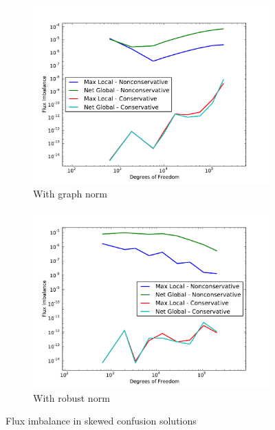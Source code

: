 \documentclass[letterpaper]{article}
\begin{document}
\begin{figure}
\centering
\begin{subfigure}[t]{0.45\textwidth}
\centering
\includegraphics[width=\textwidth]{figs/Confusion/graphFlux.pdf}
\caption{With graph norm}
\label{fig:confusionGraphFlux}
\end{subfigure}
\begin{subfigure}[t]{0.45\textwidth}
\centering
\includegraphics[width=\textwidth]{figs/Confusion/robustFlux.pdf}
\caption{With robust norm}
\label{fig:confusionRobustFlux}
\end{subfigure}
\caption{Flux imbalance in skewed confusion solutions}
\end{figure}
\end{document}
